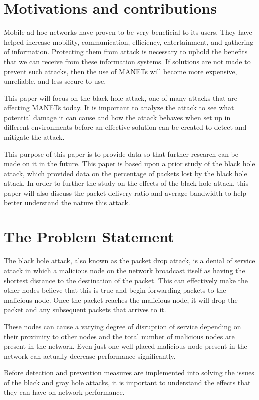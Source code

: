 \documentclass[conference,12pt]{IEEEtran}
\begin{document}
\section{Motivations and contributions}
Mobile ad hoc networks have proven to be very beneficial to its users. They have helped increase mobility, communication, efficiency, entertainment, and gathering of information. Protecting them from attack is necessary to uphold the benefits that we can receive from these information systems. If solutions are not made to prevent such attacks, then the use of MANETs will become more expensive, unreliable, and less secure to use. 

This paper will focus on the black hole attack, one of many attacks that are affecting MANETs today. It is important to analyze the attack to see what potential damage it can cause and how the attack behaves when set up in different environments before an effective solution can be created to detect and mitigate the attack. 

This purpose of this paper is to provide data so that further research can be made on it in the future. This paper is based upon a prior study of the black hole attack, which provided data on the percentage of packets lost by the black hole attack. In order to further the study on the effects of the black hole attack, this paper will also discuss the packet delivery ratio and average bandwidth to help better understand the nature this attack.


\section{The Problem Statement}
The black hole attack, also known as the packet drop attack, is a denial of service attack in which a malicious node on the network broadcast itself as having the shortest distance to the destination of the packet. This can effectively make the other nodes believe that this is true and begin forwarding packets to the malicious node. Once the packet reaches the malicious node, it will drop the packet and any subsequent packets that arrives to it.

These nodes can cause a varying degree of disruption of service depending on their proximity to other nodes and the total number of malicious nodes are present in the network. Even just one well placed malicious node present in the network can actually decrease performance significantly. 

Before detection and prevention measures are implemented into solving the issues of the black and gray hole attacks, it is important to understand the effects that they can have on network performance.  
\end{document}
